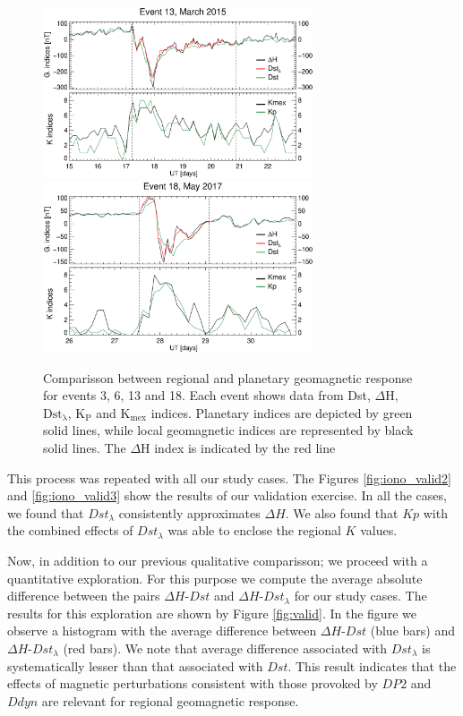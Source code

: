 \documentclass[a4paper,fleqn]{cas-dc}
\begin{document}
\begin{figure}[h!]
	\centerline{\Large \bf   
	\hspace{0.26\textwidth}  \color{black}{}
	\hspace{0.31\textwidth}  \color{black}{}
	\hfill}	   
	\includegraphics[width=8.0cm]{images/dH_approx/diono_valid_V4_2015-03-15.eps}
	\includegraphics[width=8.0cm]{images/dH_approx/diono_valid_V4_2017-05-26.eps} 		
	
	\caption{Comparisson between regional and planetary geomagnetic response for events 3, 6, 13 and 18. Each event shows data from Dst, $\Delta$H, $\mathrm{Dst_\lambda}$, $\mathrm{ K_P}$ and $\mathrm{K_{mex}}$ indices. Planetary indices are depicted by green solid lines, while local geomagnetic indices are represented by black solid lines. The $\Delta$H index is indicated by the red line}
	\label{fig:iono_valid}
\end{figure}


This process was repeated with all our study cases. The Figures \ref{fig:iono_valid2} and \ref{fig:iono_valid3} show the results of our validation exercise. In all the cases, we found that $Dst_\lambda$ consistently approximates $\Delta H$. We also found that $Kp$ with the combined effects of $Dst_\lambda$ was able to enclose the regional $K$ values.

Now, in addition to our previous qualitative comparisson; we proceed with a quantitative exploration. For this purpose we compute the average absolute difference between the pairs $\Delta H$-$Dst$ and $\Delta H$-$Dst_\lambda$ for our study cases. The results for this exploration are shown by Figure \ref{fig:valid}. In the figure we observe a histogram with the average difference between $\Delta H$-$Dst$ (blue bars) and $\Delta H$-$Dst_\lambda$ (red bars). We note that average difference associated with $Dst_\lambda$ is systematically lesser than that associated with $Dst$. This result indicates that the effects of magnetic perturbations consistent with those provoked by $DP2$ and $Ddyn$ are relevant for regional geomagnetic response.
\end{document}
